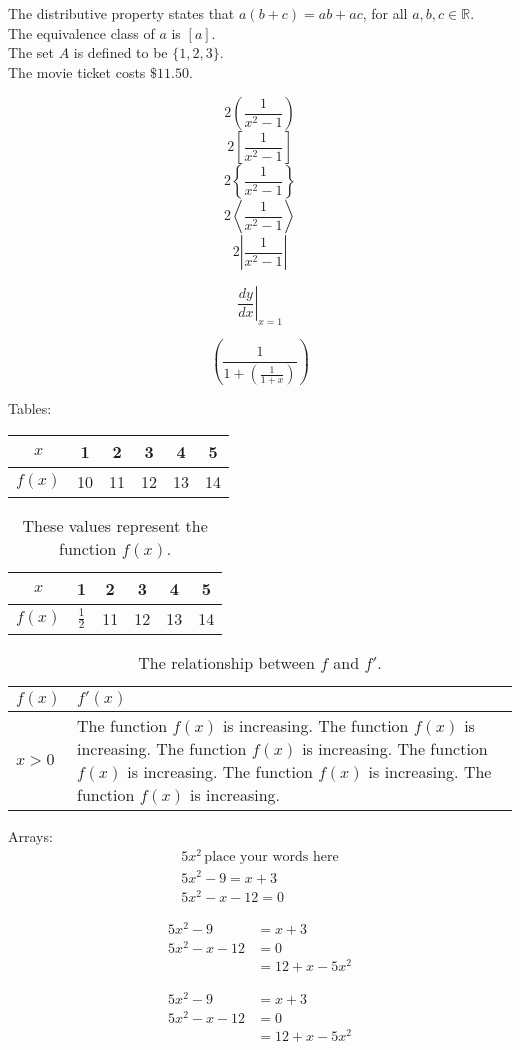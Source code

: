\documentclass[12pt]{article}
\begin{document}
The distributive property states that $a(b+c)=ab+ac$, for all $a, b, c \in \mathbb{R}$.\\[6pt]
The equivalence class of $a$ is $[a]$.\\[6pt]
The set $A$ is defined to be $\{1, 2, 3\}$.\\[6pt]
The movie ticket costs $\$11.50$.

$$2\left(\frac{1}{x^2-1}\right)$$
$$2\left[\frac{1}{x^2-1}\right]$$
$$2\left\{\frac{1}{x^2-1}\right\}$$
$$2\left\langle\frac{1}{x^2-1}\right\rangle$$
$$2\left|\frac{1}{x^2-1}\right|$$

$$\left.\frac{dy}{dx}\right|_{x=1}$$

$$\left(\frac{1}{1+\left(\frac{1}{1+x}\right)}\right)$$


Tables:\\

\begin{tabular}{|c||c|c|c|c|c|}
\hline
$x$ & 1 & 2 & 3 & 4 & 5 \\ \hline
$f(x)$ & 10 & 11 & 12 & 13 & 14 \\ \hline
\end{tabular}

\vspace{1cm}

\begin{table}[H]
\centering
\def\arraystretch{1.5}
\begin{tabular}{|c||c|c|c|c|c|}
\hline
$x$ & 1 & 2 & 3 & 4 & 5 \\ \hline
$f(x)$ & $\frac{1}{2}$ & 11 & 12 & 13 & 14 \\ \hline
\end{tabular}
\caption{These values represent the function $f(x)$.}
\end{table}

\begin{table}[H]
\centering
\caption{The relationship between $f$ and $f'$.}
\def\arraystretch{1.5}
\begin{tabular}{|l|p{10cm}|}
\hline
$f(x)$ & $f'(x)$ \\ \hline
$x>0$ & The function $f(x)$ is increasing. The function $f(x)$ is increasing. The function $f(x)$ is increasing. The function $f(x)$ is increasing. The function $f(x)$ is increasing. The function $f(x)$ is increasing.\\ \hline
\end{tabular}
\end{table}

Arrays:
\begin{align}
5x^2 \, \text{place your words here} \\
5x^2-9=x+3 \\
5x^2-x-12=0
\end{align}

\begin{align}
5x^2-9&=x+3 \\
5x^2-x-12&=0 \\
&=12+x-5x^2
\end{align}

\begin{align*}
5x^2-9&=x+3 \\
5x^2-x-12&=0 \\
&=12+x-5x^2
\end{align*}
\end{document}
